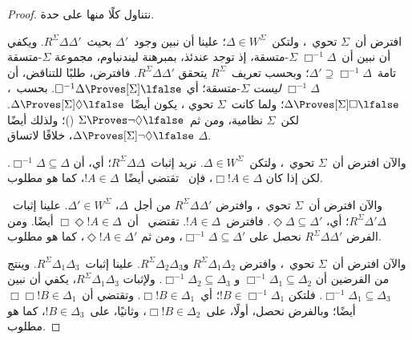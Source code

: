\documentclass[../../../include/open-logic-section]{subfiles}
\begin{document}
\begin{proof}
  نتناول كلًا منها على حدة.

  افترض أن~$\Sigma$ تحوي~، ولتكن~$\Delta \in W^\Sigma$؛ علينا
  أن نبين وجود~$\Delta'$ بحيث~$R^\Sigma \Delta\Delta'$. ويكفي أن نبين
  أن~$\Box^{-1}\Delta$ $\Sigma$-متسقة، إذ توجد عندئذ، بمبرهنة
  ليندنباوم، مجموعة $\Sigma$-متسقة تامة~$\Delta' \supseteq
  \Box^{-1}\Delta$؛ وبحسب تعريف~$R^\Sigma$
  يتحقق
  $R^\Sigma \Delta\Delta'$. فافترض، طلبًا للتناقض، أن
  $\Box^{-1}\Delta$ \emph{ليست} $\Sigma$-متسقة؛ أي
  $\Box^{-1}\Delta \Proves[\Sigma] \lfalse$. بحسب~،
  $\Delta \Proves[\Sigma] \Box\lfalse$؛ ولما كانت~$\Sigma$ تحوي
  ، يكون أيضًا~$\Delta \Proves[\Sigma] \Diamond\lfalse$.
  لكن~$\Sigma$ نظامية، ومن ثم~$\Sigma \Proves \lnot\Diamond \lfalse$
  ()؛ ولذلك أيضًا
  $\Delta \Proves[\Sigma] \lnot\Diamond \lfalse$، خلافًا لاتساق
  $\Delta$.

  والآن افترض أن~$\Sigma$ تحوي~، ولتكن~$\Delta \in W^\Sigma$.
  نريد إثبات~$R^\Sigma \Delta\Delta$؛ أي، أن
  $\Box^{-1}\Delta \subseteq \Delta$. لكن إذا كان
  $\Box!A \in \Delta$، فإن~ تقتضي أيضًا~$!A \in \Delta$، كما
  هو مطلوب.

  والآن افترض أن~$\Sigma$ تحوي~، وافترض
  $R^\Sigma \Delta\Delta'$ من أجل~$\Delta$، $\Delta' \in W^\Sigma$.
  علينا إثبات~$R^\Sigma \Delta'\Delta$؛ أي،
  $\Diamond\Delta \subseteq \Delta'$. فافترض~$!A \in \Delta$.
  تقتضي~ أن~$\Box\Diamond!A \in \Delta$ أيضًا. ومن الفرض
  $R^\Sigma \Delta\Delta'$ نحصل على
  $\Box^{-1}\Delta \subseteq \Delta'$، ومن ثم
  $\Diamond!A \in \Delta'$، كما هو مطلوب.

  والآن افترض أن~$\Sigma$ تحوي~، وافترض
  $R^\Sigma \Delta_1\Delta_2$ و$R^\Sigma \Delta_2\Delta_3$.
  علينا إثبات~$R^\Sigma \Delta_1\Delta_3$. وينتج من الفرضين
   أن
  $\Box^{-1}\Delta_1 \subseteq \Delta_2$ و
  $\Box^{-1}\Delta_2 \subseteq \Delta_3$. ولإثبات
  $R^\Sigma \Delta_1\Delta_3$، يكفي أن نبين
  $\Box^{-1}\Delta_1 \subseteq \Delta_3$. فلتكن
  $!B \in \Box^{-1}\Delta_1$؛ أي~$\Box!B \in \Delta_1$. وتقتضي
   أن~$\Box\Box!B \in \Delta_1$ أيضًا؛ وبالفرض نحصل، أولًا،
  على~$\Box!B \in \Delta_2$، وثانيًا، على~$!B \in \Delta_3$، كما هو
  مطلوب.


\end{proof}
\end{document}
